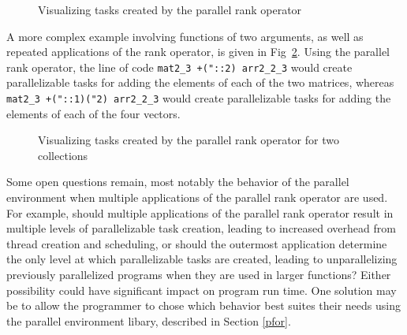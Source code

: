 \pagebreak


\begin{figure}[h]
\begin{quote}
\begin{singlespacing}
\begin{small}
\end{small}
\end{singlespacing}
\end{quote}
\caption{Visualizing tasks created by the parallel rank operator}
\label{fig::pr_tasks}
\end{figure}

A more complex example involving functions of two arguments, 
as well as repeated applications of the rank operator, is given in Fig~\ref{fig::pr_tasks2}.
Using the parallel rank operator, the line of code
\texttt{mat2\_3 +("::2) arr2\_2\_3} would create parallelizable tasks for adding the elements of each of the two matrices, whereas 
\texttt{mat2\_3 +("::1)("2) arr2\_2\_3} would create parallelizable tasks for adding the elements of each of the four vectors.

\begin{figure}[p]
\begin{quote}
\begin{singlespacing}
\begin{small}
\end{small}
\end{singlespacing}
\end{quote}
\caption{Visualizing tasks created by the parallel rank operator for two collections}
\label{fig::pr_tasks2}
\end{figure}

Some open questions remain, most notably 
the behavior of the parallel environment when multiple applications of the parallel rank operator are used. 
For example, should multiple applications of the parallel rank operator result in multiple levels of parallelizable task creation, 
leading to increased overhead from thread creation and scheduling, 
or should the outermost application determine the only level at which parallelizable tasks are created, 
leading to unparallelizing previously parallelized programs when they are used in larger functions? 
Either possibility could have significant impact on program run time.
One solution may be to allow the programmer to chose which behavior best suites their needs 
using the parallel environment libary, described in Section \ref{pfor}.


